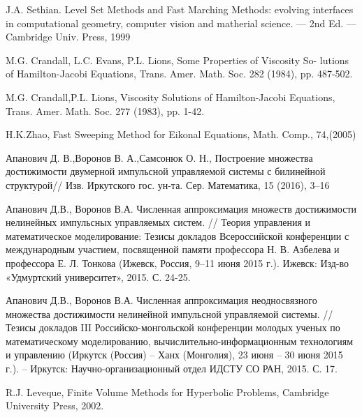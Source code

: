 \pagebreak
\begin{thebibliography}{99}

 {J.A. Sethian.} Level Set Methods and Fast Marching Methods: evolving
  interfaces in computational geometry, computer vision and matherial
  science. — 2nd Ed. — Cambridge Univ. Press, 1999

 {M.G. Crandall, L.C. Evans, P.L. Lions}, Some
  Properties of Viscosity So- lutions of Hamilton-Jacobi Equations,
  Trans. Amer. Math. Soc. 282 (1984), pp. 487-502.

 {M.G. Crandall,P.L. Lions}, Viscosity Solutions of
  Hamilton-Jacobi Equations, Trans. Amer. Math. Soc. 277 (1983),
  pp. 1-42.

 {H.K.Zhao}, Fast Sweeping Method for Eikonal Equations, Math. Comp.,
74,(2005)
  
 {Апанович Д. В.,Воронов В. А.,Самсонюк О. Н.},
  Построение множества достижимости двумерной импульсной управляемой
  системы с билинейной структурой// Изв. Иркутского
  гос. ун-та. Сер. Математика, 15 (2016), 3–16

 Апанович Д.В., Воронов В.А. Численная аппроксимация
  множеств достижимости нелинейных импульсных управляемых систем. //
  Теория управления и математическое моделирование: Тезисы докладов
  Всероссийской конференции с международным участием, посвященной
  памяти профессора Н. В. Азбелева и профессора Е. Л. Тонкова (Ижевск,
  Россия, 9–11 июня 2015 г.). Ижевск: Изд-во «Удмуртский университет»,
  2015. С. 24-25.

 Апанович Д.В., Воронов В.А. Численная аппроксимация
  неодносвязного множества достижимости нелинейной импульсной
  управляемой системы. //  Тезисы докладов III Российско-монгольской
  конференции молодых ученых по математическому моделированию,
  вычислительно-информационным технологиям и управлению (Иркутск
  (Россия) – Ханх (Монголия), 23 июня – 30 июня 2015 г.). – Иркутск:
  Научно-организационный отдел ИДСТУ СО РАН, 2015. С. 17.



 {R.J. Leveque}, Finite Volume Methods for Hyperbolic Problems, Cambridge
University Press, 2002.


  
\end{thebibliography}


